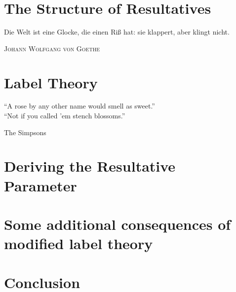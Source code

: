 \documentclass[
	draft
	]{ut-thesis}
\theoremstyle{definition}
\begin{document}
\chapter{The Structure of Resultatives}
\epigraph{Die Welt ist eine Glocke, die einen Ri\ss{} hat: sie klappert, aber klingt nicht.}{\textsc{Johann Wolfgang von Goethe}}

\chapter{Label Theory}
\epigraph{``A rose by any other name would smell as sweet.''\\
``Not if you called 'em stench blossoms.''}{The Simpsons}

%
\chapter{Deriving the Resultative Parameter}\label{sec:deriving}

\chapter{Some additional consequences of modified label theory}
\chapter{Conclusion}\label{sec:Conclusion}
\printbibliography
\end{document}
